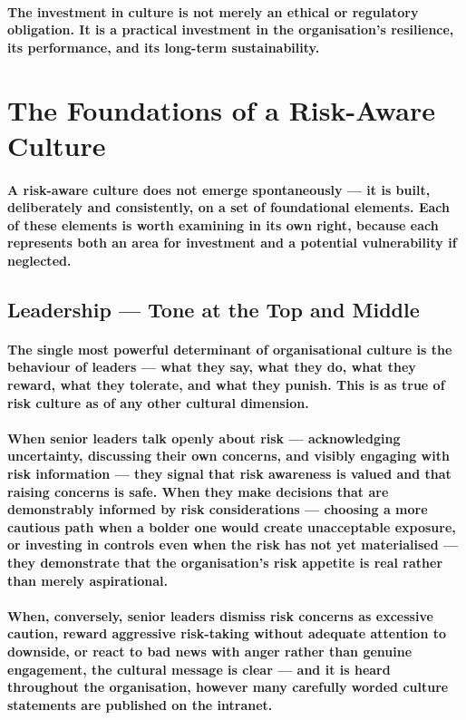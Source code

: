 \paragraph{The investment in culture is not merely an ethical or regulatory obligation. It is a practical investment in the organisation's resilience, its performance, and its long-term sustainability.}

\section{The Foundations of a Risk-Aware Culture}
\paragraph{A risk-aware culture does not emerge spontaneously — it is built, deliberately and consistently, on a set of foundational elements. Each of these elements is worth examining in its own right, because each represents both an area for investment and a potential vulnerability if neglected.}

\subsection{Leadership — Tone at the Top and Middle}
\paragraph{The single most powerful determinant of organisational culture is the behaviour of leaders — what they say, what they do, what they reward, what they tolerate, and what they punish. This is as true of risk culture as of any other cultural dimension.}
\paragraph{When senior leaders talk openly about risk — acknowledging uncertainty, discussing their own concerns, and visibly engaging with risk information — they signal that risk awareness is valued and that raising concerns is safe. When they make decisions that are demonstrably informed by risk considerations — choosing a more cautious path when a bolder one would create unacceptable exposure, or investing in controls even when the risk has not yet materialised — they demonstrate that the organisation's risk appetite is real rather than merely aspirational.}
\paragraph{When, conversely, senior leaders dismiss risk concerns as excessive caution, reward aggressive risk-taking without adequate attention to downside, or react to bad news with anger rather than genuine engagement, the cultural message is clear — and it is heard throughout the organisation, however many carefully worded culture statements are published on the intranet.}
